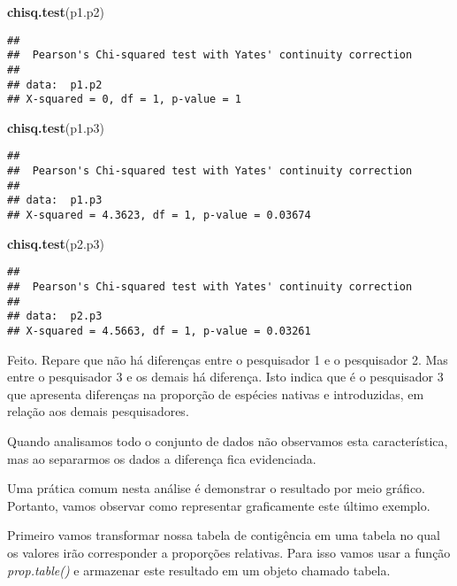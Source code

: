 \documentclass[]{book}
\newenvironment{Shaded}{\begin{snugshade}}{\end{snugshade}}
\newcommand{\KeywordTok}[1]{\textcolor[rgb]{0.13,0.29,0.53}{\textbf{#1}}}
\newcommand{\NormalTok}[1]{#1}
\begin{document}
\begin{Shaded}
\begin{Highlighting}[]
\KeywordTok{chisq.test}\NormalTok{(p1.p2)}
\end{Highlighting}
\end{Shaded}

\begin{verbatim}
## 
##  Pearson's Chi-squared test with Yates' continuity correction
## 
## data:  p1.p2
## X-squared = 0, df = 1, p-value = 1
\end{verbatim}

\begin{Shaded}
\begin{Highlighting}[]
\KeywordTok{chisq.test}\NormalTok{(p1.p3)}
\end{Highlighting}
\end{Shaded}

\begin{verbatim}
## 
##  Pearson's Chi-squared test with Yates' continuity correction
## 
## data:  p1.p3
## X-squared = 4.3623, df = 1, p-value = 0.03674
\end{verbatim}

\begin{Shaded}
\begin{Highlighting}[]
\KeywordTok{chisq.test}\NormalTok{(p2.p3)}
\end{Highlighting}
\end{Shaded}

\begin{verbatim}
## 
##  Pearson's Chi-squared test with Yates' continuity correction
## 
## data:  p2.p3
## X-squared = 4.5663, df = 1, p-value = 0.03261
\end{verbatim}

Feito. Repare que não há diferenças entre o pesquisador 1 e o pesquisador 2. Mas entre o pesquisador 3 e os demais há diferença. Isto indica que é o pesquisador 3 que apresenta diferenças na proporção de espécies nativas e introduzidas, em relação aos demais pesquisadores.

Quando analisamos todo o conjunto de dados não observamos esta característica, mas ao separarmos os dados a diferença fica evidenciada.

Uma prática comum nesta análise é demonstrar o resultado por meio gráfico. Portanto, vamos observar como representar graficamente este último exemplo.

Primeiro vamos transformar nossa tabela de contigência em uma tabela no qual os valores irão corresponder a proporções relativas. Para isso vamos usar a função \emph{prop.table()} e armazenar este resultado em um objeto chamado tabela.
\end{document}
